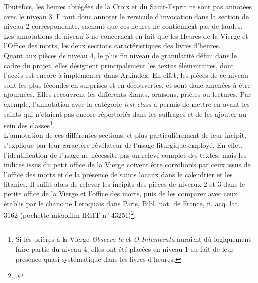 \documentclass[a4paper,12pt,twoside]{book}
\begin{document}
Toutefois, les heures abrégées de la Croix et du Saint-Esprit ne sont pas annotées avec le niveau 3. Il faut donc annoter le versicule d’invocation dans la section de niveau 2 correspondante, sachant que ces heures ne contiennent pas de laudes. Les annotations de niveau 3 ne concernent en fait que les Heures de la Vierge et l’Office des morts, les deux sections caractéristiques des livres d'heures.\\

Quant aux pièces de niveau 4, le plus fin niveau de granularité défini dans le cadre du projet, elles désignent principalement les textes élémentaires, dont l'accès est encore à implémenter dans Arkindex. En effet, les pièces de ce niveau sont les plus fécondes en surprises et en découvertes, et sont donc amenées à être ajournées. Elles recouvrent les différents chants, oraisons, prières ou lectures. Par exemple, l'annotation avec la catégorie \og \textit{test-class}\fg{} a permis de mettre en avant les saints qui n'étaient pas encore répertoriés dans les suffrages et de les ajouter au sein des classes\footnote{Si les prières à la Vierge \textit{Obsecro te} et \textit{O Intemerata} auraient dû logiquement faire partie du niveau 4, elles ont été placées en niveau 1 du fait de leur présence quasi systématique dans les livres d'heures.}.\\

L'annotation de ces différentes sections, et plus particulièrement de leur incipit, s'explique par leur caractère révélateur de l'usage liturgique employé. En effet, l'identification de l'usage ne nécessite pas un relevé complet des textes, mais les indices issus du petit office de la Vierge doivent être corroborés par ceux issus de l'office des morts et de la présence de saints locaux dans le calendrier et les litanies. Il suffit alors de relever les incipits des pièces de niveaux 2 et 3 dans le petite office de la Vierge et l'office des morts, puis de les comparer avec ceux établis par le chanoine Leroquais dans Paris, Bibl. nat. de France, n. acq. lat. 3162 (pochette microfilm IRHT n° 43251)\footcite[p. 105-106]{initiation_man_lit}.\\ 
\end{document}
